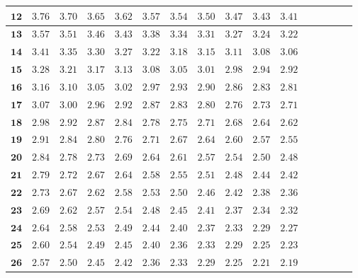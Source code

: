 \begin{alternateColorTable}
\begin{longtable}{|r|r|r|r|r|r|r|r|r|r|r|r|r|r|r|r|}
    \(\mathbf{12}\) & \(3.76\) & \(3.70\) & \(3.65\) & \(3.62\) & \(3.57\) & \(3.54\) & \(3.50\) & \(3.47\) & \(3.43\) & \(3.41\) \\  \hline 
    \(\mathbf{13}\) & \(3.57\) & \(3.51\) & \(3.46\) & \(3.43\) & \(3.38\) & \(3.34\) & \(3.31\) & \(3.27\) & \(3.24\) & \(3.22\) \\  \hline 
    \(\mathbf{14}\) & \(3.41\) & \(3.35\) & \(3.30\) & \(3.27\) & \(3.22\) & \(3.18\) & \(3.15\) & \(3.11\) & \(3.08\) & \(3.06\) \\  \hline 
    \(\mathbf{15}\) & \(3.28\) & \(3.21\) & \(3.17\) & \(3.13\) & \(3.08\) & \(3.05\) & \(3.01\) & \(2.98\) & \(2.94\) & \(2.92\) \\  \hline 
    \(\mathbf{16}\) & \(3.16\) & \(3.10\) & \(3.05\) & \(3.02\) & \(2.97\) & \(2.93\) & \(2.90\) & \(2.86\) & \(2.83\) & \(2.81\) \\  \hline 
    \(\mathbf{17}\) & \(3.07\) & \(3.00\) & \(2.96\) & \(2.92\) & \(2.87\) & \(2.83\) & \(2.80\) & \(2.76\) & \(2.73\) & \(2.71\) \\  \hline 
    \(\mathbf{18}\) & \(2.98\) & \(2.92\) & \(2.87\) & \(2.84\) & \(2.78\) & \(2.75\) & \(2.71\) & \(2.68\) & \(2.64\) & \(2.62\) \\  \hline 
    \(\mathbf{19}\) & \(2.91\) & \(2.84\) & \(2.80\) & \(2.76\) & \(2.71\) & \(2.67\) & \(2.64\) & \(2.60\) & \(2.57\) & \(2.55\) \\  \hline 
    \(\mathbf{20}\) & \(2.84\) & \(2.78\) & \(2.73\) & \(2.69\) & \(2.64\) & \(2.61\) & \(2.57\) & \(2.54\) & \(2.50\) & \(2.48\) \\  \hline 
    \(\mathbf{21}\) & \(2.79\) & \(2.72\) & \(2.67\) & \(2.64\) & \(2.58\) & \(2.55\) & \(2.51\) & \(2.48\) & \(2.44\) & \(2.42\) \\  \hline 
    \(\mathbf{22}\) & \(2.73\) & \(2.67\) & \(2.62\) & \(2.58\) & \(2.53\) & \(2.50\) & \(2.46\) & \(2.42\) & \(2.38\) & \(2.36\) \\  \hline 
    \(\mathbf{23}\) & \(2.69\) & \(2.62\) & \(2.57\) & \(2.54\) & \(2.48\) & \(2.45\) & \(2.41\) & \(2.37\) & \(2.34\) & \(2.32\) \\  \hline 
    \(\mathbf{24}\) & \(2.64\) & \(2.58\) & \(2.53\) & \(2.49\) & \(2.44\) & \(2.40\) & \(2.37\) & \(2.33\) & \(2.29\) & \(2.27\) \\  \hline 
    \(\mathbf{25}\) & \(2.60\) & \(2.54\) & \(2.49\) & \(2.45\) & \(2.40\) & \(2.36\) & \(2.33\) & \(2.29\) & \(2.25\) & \(2.23\) \\  \hline 
    \(\mathbf{26}\) & \(2.57\) & \(2.50\) & \(2.45\) & \(2.42\) & \(2.36\) & \(2.33\) & \(2.29\) & \(2.25\) & \(2.21\) & \(2.19\) \\  \hline 

\end{longtable}
\end{alternateColorTable}
